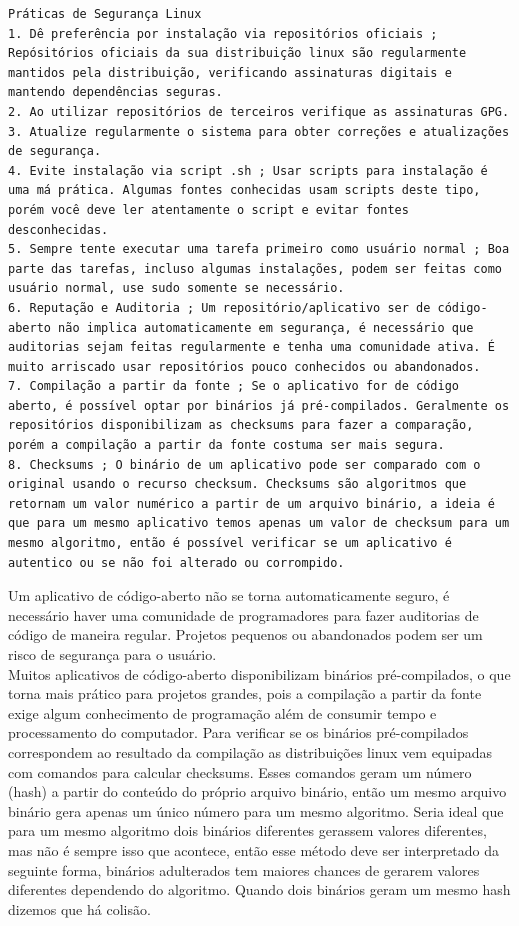 \documentclass[12pt,a4paper]{article}
\begin{document}
\begin{lstlisting}
Práticas de Segurança Linux 
1. Dê preferência por instalação via repositórios oficiais ; Repósitórios oficiais da sua distribuição linux são regularmente mantidos pela distribuição, verificando assinaturas digitais e mantendo dependências seguras.
2. Ao utilizar repositórios de terceiros verifique as assinaturas GPG.
3. Atualize regularmente o sistema para obter correções e atualizações de segurança.
4. Evite instalação via script .sh ; Usar scripts para instalação é uma má prática. Algumas fontes conhecidas usam scripts deste tipo, porém você deve ler atentamente o script e evitar fontes desconhecidas. 
5. Sempre tente executar uma tarefa primeiro como usuário normal ; Boa parte das tarefas, incluso algumas instalações, podem ser feitas como usuário normal, use sudo somente se necessário.
6. Reputação e Auditoria ; Um repositório/aplicativo ser de código-aberto não implica automaticamente em segurança, é necessário que auditorias sejam feitas regularmente e tenha uma comunidade ativa. É muito arriscado usar repositórios pouco conhecidos ou abandonados. 
7. Compilação a partir da fonte ; Se o aplicativo for de código aberto, é possível optar por binários já pré-compilados. Geralmente os repositórios disponibilizam as checksums para fazer a comparação, porém a compilação a partir da fonte costuma ser mais segura. 
8. Checksums ; O binário de um aplicativo pode ser comparado com o original usando o recurso checksum. Checksums são algoritmos que retornam um valor numérico a partir de um arquivo binário, a ideia é que para um mesmo aplicativo temos apenas um valor de checksum para um mesmo algoritmo, então é possível verificar se um aplicativo é autentico ou se não foi alterado ou corrompido. 
\end{lstlisting}

\vspace{\baselineskip}

Um aplicativo de código-aberto não se torna automaticamente seguro, é necessário haver uma comunidade de programadores para fazer auditorias de código de maneira regular. Projetos pequenos ou abandonados podem ser um risco de segurança para o usuário. \\

Muitos aplicativos de código-aberto disponibilizam binários pré-compilados, o que torna mais prático para projetos grandes, pois a compilação a partir da fonte exige algum conhecimento de programação além de consumir tempo e processamento do computador. Para verificar se os binários pré-compilados correspondem ao resultado da compilação as distribuições linux vem equipadas com comandos para calcular checksums. Esses comandos geram um número (hash) a partir do conteúdo do próprio arquivo binário, então um mesmo arquivo binário gera apenas um único número para um mesmo algoritmo. Seria ideal que para um mesmo algoritmo dois binários diferentes gerassem valores diferentes, mas não é sempre isso que acontece, então esse método deve ser interpretado da seguinte forma, binários adulterados tem maiores chances de gerarem valores diferentes dependendo do algoritmo. Quando dois binários geram um mesmo hash dizemos que há colisão. \\
\end{document}
